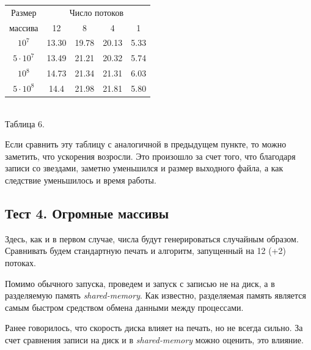 \begin{center}
\begin{tabular}{||c|c|c|c|c||}
\hline
\hline
Размер & \multicolumn{4}{c|}{Число потоков}\\
\hhline{~|-|-|-|-|}
массива & 12 & 8 & 4 & 1 \\
\hline
$10^7$  & 13.30 & 19.78 & 20.13 & 5.33 \\
\hline
$5 \cdot 10^7$ & 13.49 & 21.21 & 20.32 & 5.74 \\
\hline
$10^8$ &14.73 & 21.34 & 21.31 & 6.03 \\
\hline
$5 \cdot 10^8$ &14.4 & 21.98 & 21.81 & 5.80 \\
\hline
\hline
\end{tabular}
\\
\vspace{14pt}
\small{Таблица 6.}
\end{center}

Если сравнить эту таблицу с аналогичной в предыдущем пункте, то можно заметить, что ускорения возросли.
Это произошло за счет того, что благодаря записи со звездами, заметно уменьшился и размер выходного файла, а как следствие уменьшилось и время работы.

\subsection{Тест 4. Огромные массивы} \label{subsec2:3}
Здесь, как и в первом случае, числа будут генерироваться случайным образом.
Сравнивать будем стандартную печать и алгоритм, запущенный на 12 (+2) потоках.

Помимо обычного запуска, проведем и запуск с записью не на диск, а в разделяемую память \textit{shared-memory}.
Как известно, разделяемая память является самым быстром средством обмена данными между процессами.

Ранее говорилось, что скорость диска влияет на печать, но не всегда сильно.
За счет сравнения записи на диск и в \textit{shared-memory} можно оценить, это влияние.

